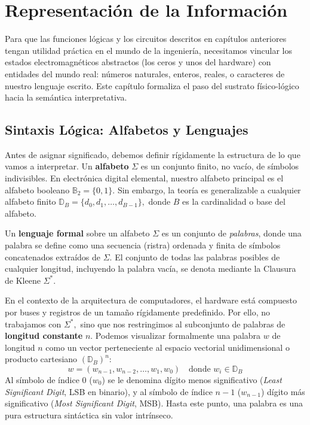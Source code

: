 \chapter{Representación de la Información}

Para que las funciones lógicas y los circuitos descritos en capítulos anteriores tengan utilidad práctica en el mundo de la ingeniería, necesitamos vincular los estados electromagnéticos abstractos (los ceros y unos del hardware) con entidades del mundo real: números naturales, enteros, reales, o caracteres de nuestro lenguaje escrito. Este capítulo formaliza el paso del sustrato físico-lógico hacia la semántica interpretativa.

\section{Sintaxis Lógica: Alfabetos y Lenguajes}

Antes de asignar significado, debemos definir rígidamente la estructura de lo que vamos a interpretar.
Un \textbf{alfabeto} $\Sigma$ es un conjunto finito, no vacío, de símbolos indivisibles. En electrónica digital elemental, nuestro alfabeto principal es el alfabeto booleano $\mathbb{B}_2 = \{0, 1\}.$ Sin embargo, la teoría es generalizable a cualquier alfabeto finito $\mathbb{D}_B = \{d_0, d_1, \dots, d_{B-1}\},$ donde $B$ es la cardinalidad o base del alfabeto.

Un \textbf{lenguaje formal} sobre un alfabeto $\Sigma$ es un conjunto de \textit{palabras}, donde una palabra se define como una secuencia (ristra) ordenada y finita de símbolos concatenados extraídos de $\Sigma.$ El conjunto de todas las palabras posibles de cualquier longitud, incluyendo la palabra vacía, se denota mediante la Clausura de Kleene $\Sigma^*.$

En el contexto de la arquitectura de computadores, el hardware está compuesto por buses y registros de un tamaño rígidamente predefinido. Por ello, no trabajamos con $\Sigma^*,$ sino que nos restringimos al subconjunto de palabras de \textbf{longitud constante} $n.$ 
Podemos visualizar formalmente una palabra $w$ de longitud $n$ como un vector perteneciente al espacio vectorial unidimensional o producto cartesiano $(\mathbb{D}_B)^n:$
\[ w = (w_{n-1}, w_{n-2}, \dots, w_1, w_0) \quad \text{donde } w_i \in \mathbb{D}_B \]
Al símbolo de índice $0$ ($w_0$) se le denomina dígito menos significativo (\textit{Least Significant Digit}, LSB en binario), y al símbolo de índice $n-1$ ($w_{n-1}$) dígito más significativo (\textit{Most Significant Digit}, MSB). Hasta este punto, una palabra es una pura estructura sintáctica sin valor intrínseco.

